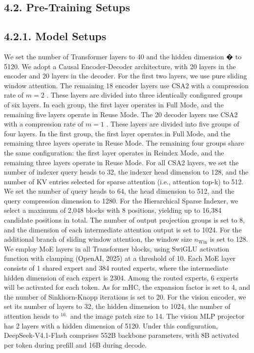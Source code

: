 \documentclass[
  10
]{article}
\begin{document}
\subsection{4.2. Pre-Training Setups}\label{pre-training-setups}

\subsection{4.2.1. Model Setups}\label{model-setups}

We set the number of Transformer layers to 40 and the hidden dimension �
to 5120. We adopt a Causal Encoder-Decoder architecture, with 20 layers
in the encoder and 20 layers in the decoder. For the first two layers,
we use pure sliding window attention. The remaining 18 encoder layers
use CSA2 with a compression rate of \(m = 2\) . These layers are divided
into three identically configured groups of six layers. In each group,
the first layer operates in Full Mode, and the remaining five layers
operate in Reuse Mode. The 20 decoder layers use CSA2 with a compression
rate of \(m = 1\) . These layers are divided into five groups of four
layers. In the first group, the first layer operates in Full Mode, and
the remaining three layers operate in Reuse Mode. The remaining four
groups share the same configuration: the first layer operates in Reindex
Mode, and the remaining three layers operate in Reuse Mode. For all CSA2
layers, we set the number of indexer query heads to 32, the indexer head
dimension to 128, and the number of KV entries selected for sparse
attention (i.e., attention top-k) to 512. We set the number of query
heads to 64, the head dimension to 512, and the query compression
dimension to 1280. For the Hierarchical Sparse Indexer, we select a
maximum of 2,048 blocks with 8 positions, yielding up to 16,384
candidate positions in total. The number of output projection groups is
set to 8, and the dimension of each intermediate attention output is set
to 1024. For the additional branch of sliding window attention, the
window size \(n _ { \mathrm { W i n } }\) is set to 128. We employ MoE
layers in all Transformer blocks, using SwiGLU activation function with
clamping (OpenAI, 2025) at a threshold of 10. Each MoE layer consists of
1 shared expert and 384 routed experts, where the intermediate hidden
dimension of each expert is 2304. Among the routed experts, 6 experts
will be activated for each token. As for mHC, the expansion factor is
set to 4, and the number of Sinkhorn-Knopp iterations is set to 20. For
the vision encoder, we set its number of layers to 32, the hidden
dimension to 1024, the number of attention heads to \(^ { 1 6 , }\) and
the image patch size to 14. The vision MLP projector has 2 layers with a
hidden dimension of 5120. Under this configuration, DeepSeek-V4.1-Flash
comprises 552B backbone parameters, with 8B activated per token during
prefill and 16B during decode.
\end{document}
